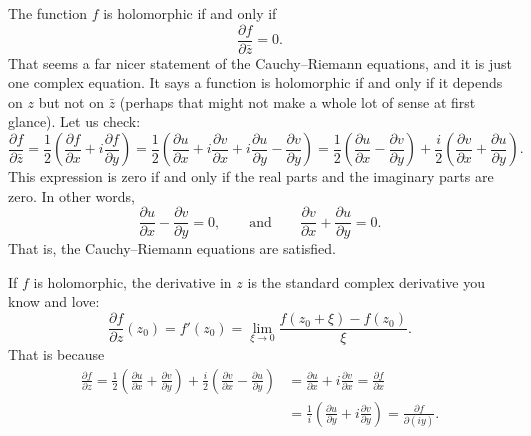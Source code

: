 \documentclass[12pt,openany]{book}
\theoremstyle{plain}
\theoremstyle{remark}
\theoremstyle{definition}
\theoremstyle{exercise}
\theoremstyle{example}
\begin{document}
The function $f$ is holomorphic if and only if
\begin{equation*}
\frac{\partial f}{\partial \bar{z}} = 0 .
\end{equation*}
That seems a far nicer statement of the Cauchy--Riemann equations, and it is
just one complex equation.  It says
a function is holomorphic if and only if it depends on $z$ but not on
$\bar{z}$ (perhaps that might not make a whole lot of sense at first
glance).
Let us check:
\begin{equation*}
\frac{\partial f}{\partial \bar{z}} 
=
\frac{1}{2}
\left(
\frac{\partial f}{\partial x} + i
\frac{\partial f}{\partial y}
\right)
=
\frac{1}{2}
\left(
\frac{\partial u}{\partial x} 
+ i \frac{\partial v}{\partial x} 
+ i \frac{\partial u}{\partial y}
- \frac{\partial v}{\partial y}
\right) 
=
\frac{1}{2}
\left(
\frac{\partial u}{\partial x} 
- \frac{\partial v}{\partial y}
\right)
+
\frac{i}{2}
\left(
\frac{\partial v}{\partial x} 
+ \frac{\partial u}{\partial y}
\right) .
\end{equation*}
This expression is zero if and only if the real parts and the imaginary
parts are zero.  In other words, %
\begin{equation*}
\frac{\partial u}{\partial x} 
- \frac{\partial v}{\partial y}
= 0,
\qquad
\text{and}
\qquad
\frac{\partial v}{\partial x} 
+ \frac{\partial u}{\partial y} = 0
.
\end{equation*}
That is, the Cauchy--Riemann equations are satisfied.

If $f$ is holomorphic, the derivative in $z$ is the standard complex derivative you know and love:
\begin{equation*}
\frac{\partial f}{\partial z} (z_0)
=
f'(z_0)
=
\lim_{\xi \to 0} \frac{f(z_0+\xi)-f(z_0)}{\xi} .
\end{equation*}
That is because 
\begin{equation*}
\begin{split}
\frac{\partial f}{\partial z} 
=
\frac{1}{2}
\left(
\frac{\partial u}{\partial x} 
+ \frac{\partial v}{\partial y}
\right)
+
\frac{i}{2}
\left( \frac{\partial v}{\partial x} - \frac{\partial u}{\partial y}
\right) 
& =
\frac{\partial u}{\partial x} 
+ i \frac{\partial v}{\partial x}
 =
\frac{\partial f}{\partial x}
\\
& =
\frac{1}{i} \left(
\frac{\partial u}{\partial y}
+ i
\frac{\partial v}{\partial y} 
\right)
 =
\frac{\partial f}{\partial (iy)}
.
\end{split}
\end{equation*}
\end{document}
